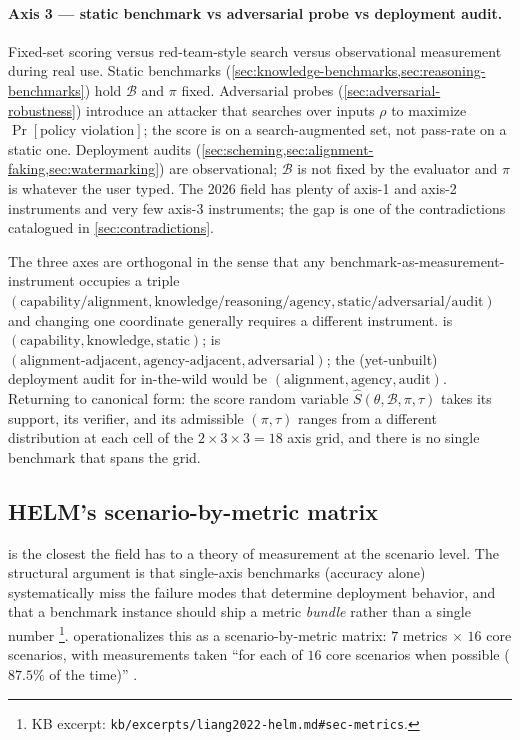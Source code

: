 \paragraph{Axis 3 --- static benchmark vs adversarial probe vs
deployment audit.} Fixed-set scoring versus red-team-style search
versus observational measurement during real use. Static benchmarks
(\cref{sec:knowledge-benchmarks,sec:reasoning-benchmarks}) hold
$\mathcal{B}$ and $\pi$ fixed. Adversarial probes
(\cref{sec:adversarial-robustness}) introduce an attacker that
searches over inputs $\rho$ to maximize $\Pr[\text{policy violation}]$;
the score is  on a search-augmented set, not
pass-rate on a static one. Deployment audits
(\cref{sec:scheming,sec:alignment-faking,sec:watermarking}) are
observational; $\mathcal{B}$ is not fixed by the evaluator and $\pi$
is whatever the user typed. The 2026 field has plenty of axis-1 and
axis-2 instruments and very few axis-3 instruments; the gap is one
of the contradictions catalogued in \cref{sec:contradictions}.

\begin{intuition}
The three axes are orthogonal in the sense that any
benchmark-as-measurement-instrument occupies a triple
$(\text{capability/alignment}, \text{knowledge/reasoning/agency},
\text{static/adversarial/audit})$ and changing one coordinate
generally requires a different instrument.  is
$(\text{capability}, \text{knowledge}, \text{static})$;  is
$(\text{alignment-adjacent}, \text{agency-adjacent},
\text{adversarial})$; the (yet-unbuilt) deployment audit for
in-the-wild  would be
$(\text{alignment}, \text{agency}, \text{audit})$. Returning to
canonical form: the score random variable
$\hat{S}(\theta, \mathcal{B}, \pi, \tau)$ takes its support, its
verifier, and its admissible $(\pi, \tau)$ ranges from a different
distribution at each cell of the $2\times 3\times 3 = 18$ axis grid,
and there is no single benchmark that spans the grid.
\end{intuition}

\subsection{HELM's scenario-by-metric matrix}
\label{sec:measuring-helm}

 \citep{liang2022-helm} is the closest the field has to a
theory of measurement at the scenario level. The structural argument
is that single-axis benchmarks (accuracy alone) systematically miss
the failure modes that determine deployment behavior, and that a
benchmark instance should ship a metric \emph{bundle} rather than a
single number%
\footnote{KB excerpt: \texttt{kb/excerpts/liang2022-helm.md\#sec-metrics}.}.
 operationalizes this as a scenario-by-metric matrix: $7$ metrics
$\times$ $16$ core scenarios, with measurements taken
``for each of $16$ core scenarios when possible ($87.5\%$ of the
time)'' \citep[\S{}abstract]{liang2022-helm}.

